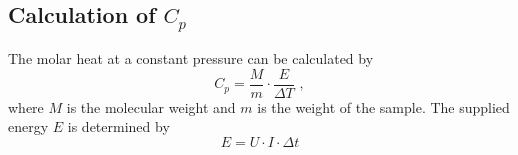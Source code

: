 \subsection{Calculation of $C_p$}
The molar heat at a constant pressure can be calculated by 
\begin{equation}
    C_p = \frac{M}{m} \cdot \frac{E}{\Delta T} \,\, , 
    \label{eqn:Cp}
\end{equation}
where $M$ is the molecular weight and $m$ is the weight of the sample. 
The supplied energy $E$ is determined by 
\begin{equation*}
    E = U \cdot I \cdot \Delta t
\end{equation*}